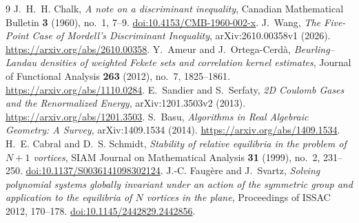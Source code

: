 \documentclass[11pt]{article}
\theoremstyle{remark}
\numberwithin{equation}{section}
\begin{document}
\begin{thebibliography}{9}
\small
\setlength{\itemsep}{2pt}
J.~H.~H. Chalk, \emph{A note on a discriminant inequality},
Canadian Mathematical Bulletin \textbf{3} (1960), no.~1, 7--9.
\href{https://doi.org/10.4153/CMB-1960-002-x}{doi:10.4153/CMB-1960-002-x}.
J.~Wang, \emph{The Five-Point Case of Mordell's Discriminant Inequality},
arXiv:2610.00358v1 (2026). \url{https://arxiv.org/abs/2610.00358}.
Y.~Ameur and J.~Ortega-Cerd\`a,
\emph{Beurling--Landau densities of weighted Fekete sets and correlation
kernel estimates}, Journal of Functional Analysis \textbf{263}
(2012), no.~7, 1825--1861. \url{https://arxiv.org/abs/1110.0284}.
E.~Sandier and S.~Serfaty, \emph{2D Coulomb Gases and the Renormalized
Energy}, arXiv:1201.3503v2 (2013).
\url{https://arxiv.org/abs/1201.3503}.
S.~Basu, \emph{Algorithms in Real Algebraic Geometry: A Survey},
arXiv:1409.1534 (2014). \url{https://arxiv.org/abs/1409.1534}.
H.~E. Cabral and D.~S. Schmidt,
\emph{Stability of relative equilibria in the problem of $N+1$ vortices},
SIAM Journal on Mathematical Analysis \textbf{31} (1999), no.~2, 231--250.
\href{https://doi.org/10.1137/S0036141098302124}{doi:10.1137/S0036141098302124}.
J.-C. Faug\`ere and J.~Svartz,
\emph{Solving polynomial systems globally invariant under an action of
the symmetric group and application to the equilibria of $N$ vortices
in the plane}, Proceedings of ISSAC 2012, 170--178.
\href{https://doi.org/10.1145/2442829.2442856}{doi:10.1145/2442829.2442856}.
\end{thebibliography}
\end{document}
